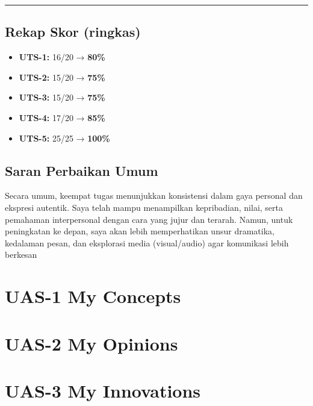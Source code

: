 \documentclass[
  letterpaper,
  DIV=11,
  numbers=noendperiod]{scrreprt}
\providecommand{\tightlist}{%
  \setlength{\itemsep}{0pt}\setlength{\parskip}{0pt}}
\begin{document}
\begin{center}\rule{0.5\linewidth}{0.5pt}\end{center}

\section{Rekap Skor (ringkas)}\label{rekap-skor-ringkas}

\begin{itemize}
\tightlist
\item
  \textbf{UTS-1:} 16/20 → \textbf{80\%}
\item
  \textbf{UTS-2:} 15/20 → \textbf{75\%}
\item
  \textbf{UTS-3:} 15/20 → \textbf{75\%}
\item
  \textbf{UTS-4:} 17/20 → \textbf{85\%}
\item
  \textbf{UTS-5:} 25/25 → \textbf{100\%}
\end{itemize}

\section{Saran Perbaikan Umum}\label{saran-perbaikan-umum}

Secara umum, keempat tugas menunjukkan konsistensi dalam gaya personal
dan ekspresi autentik. Saya telah mampu menampilkan kepribadian, nilai,
serta pemahaman interpersonal dengan cara yang jujur dan terarah. Namun,
untuk peningkatan ke depan, saya akan lebih memperhatikan unsur
dramatika, kedalaman pesan, dan eksplorasi media (visual/audio) agar
komunikasi lebih berkesan


\chapter{UAS-1 My Concepts}\label{uas-1-my-concepts}


\chapter{UAS-2 My Opinions}\label{uas-2-my-opinions}


\chapter{UAS-3 My Innovations}\label{uas-3-my-innovations}
\end{document}
